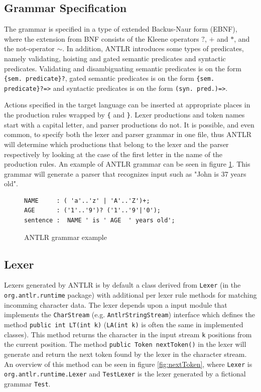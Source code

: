 \subsection{Grammar Specification}
The grammar is specified in a type of extended Backus-Naur form (EBNF), where the extension from BNF consists of the Kleene operators $?$, $ +$ and $\ast$, and the not-operator $\sim$.  In addition, ANTLR introduces some types of predicates, namely validating, hoisting and gated semantic predicates and syntactic predicates. Validating and disambiguating semantic predicates is on the form \verb!{sem. predicate}?!, gated semantic predicates is on the form \verb!{sem. predicate}?=>! and syntactic predicates is on the form \verb!(syn. pred.)=>!.

Actions specified in the target language can be inserted at appropriate places in the production rules wrapped by \verb!{! and \verb!}!. Lexer productions and token names start with a capital letter, and parser productions do not. It is possible, and even common, to specify both the lexer and parser grammar in one file, thus ANTLR will determine which productions that belong to the lexer and the parser respectively by looking at the case of the first letter in the name of the production rules. An example of ANTLR grammar can be seen in figure \ref{code:simpleGrammar}. This grammar will generate a parser that recognizes input such as "John is 37 years old".
\begin{figure}[h!]
\begin{verbatim}
NAME     : ( 'a'..'z' | 'A'..'Z')+;  
AGE      : ('1'..'9')? ('1'..'9'|'0');
sentence :  NAME ' is ' AGE  ' years old';
\end{verbatim}
\caption{ANTLR grammar example}
\label{code:simpleGrammar}
\end{figure}

\subsection{Lexer}
Lexers generated by ANTLR is by default a class derived from \verb!Lexer! (in the \verb!org.antlr.runtime! package) with additional per lexer rule methods for matching incomming character data. The lexer depends upon a input module that implements the \verb!CharStream! (e.g. \verb!AntlrStringStream!) interface which defines the method \verb!public int LT(int k)! (\verb!LA(int k)! is often the same in implemented classes). This method returns the character in the input stream \verb!k! positions from the current position. The method \verb!public Token nextToken()! in the lexer will generate and return the next token found by the lexer in the character stream. An overview of this method can be seen in figure \ref{fig:nextToken}, where \verb!Lexer! is \verb!org.antlr.runtime.Lexer! and \verb!TestLexer! is the lexer generated by a fictional grammar \verb!Test!.

